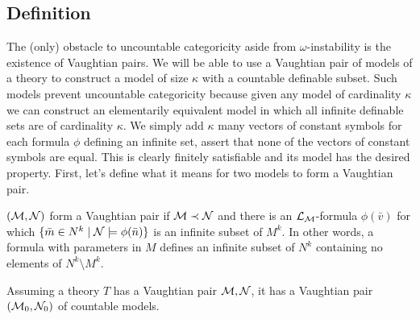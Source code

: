 \subsection{Definition}
The (only) obstacle to uncountable categoricity aside from \(\omega\)-instability is the existence of Vaughtian pairs. %
We will be able to use a Vaughtian pair of models of a theory to construct a model of size \(\kappa\) with a countable definable subset.  
Such models prevent uncountable categoricity because given any model of cardinality \(\kappa\) we can construct an elementarily equivalent model in which all infinite definable sets are of cardinality \(\kappa\).
We simply add \(\kappa\) many vectors of constant symbols for each formula \(\phi\) defining an infinite set, assert that none of the vectors of constant symbols are equal. This is clearly finitely satisfiable and its model has the desired property.
First, let's define what it means for two models to form a Vaughtian pair. %

\begin{definition}\label{definition_vaughtian_pairs}
\((\mathcal{M}, \mathcal{N})\) form a Vaughtian pair if \(\mathcal{M} \prec \mathcal{N}\) and there is an \(\mathcal{L}_{\mathcal{M}}\)-formula \(\phi(\bar{v})\) for which
\(\{\bar{m} \in N^k \mid \mathcal{N} \models \phi(\bar{n})\}\) is an infinite subset of \(M^k\). %
In other words, a formula with parameters in \(M\) defines an infinite subset of \(N^k\) containing no elements of \(N^k \setminus M^k\).
\end{definition}

\begin{theorem}\label{thm_countable_vaughtian_pairs}
Assuming a theory \(T\) has a Vaughtian pair \(\mathcal{M}, \mathcal{N}\), it has a Vaughtian pair \((\mathcal{M}_0, \mathcal{N}_0)\) of countable models. 
\end{theorem}


